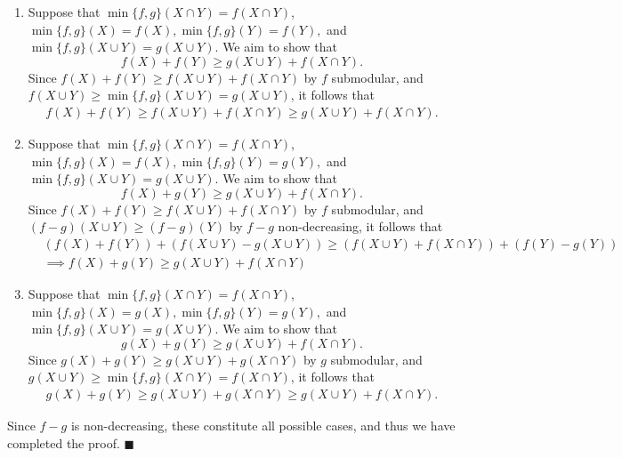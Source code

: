 \documentclass{article}
\begin{document}
\begin{enumerate}[label=(\roman*)]
\begin{enumerate}[label=Case \arabic*:]
      \item Suppose that $\min\{f,g\}(X\cap Y)=f(X\cap Y)$, $\min\{f,g\}(X)=f(X),\min\{f,g\}(Y)=f(Y),$ and $\min\{f,g\}(X\cup Y)=g(X\cup Y).$ We aim to show that $$f(X)+f(Y)\geq g(X\cup Y)+f(X\cap Y).$$Since $f(X)+f(Y)\geq f(X\cup Y)+f(X\cap Y)$ by $f$ submodular, and $f(X\cup Y)\geq \min\{f,g\}(X\cup Y)=g(X\cup Y)$, it follows that
      \begin{align*}
           f(X)+f(Y)\geq f(X\cup Y)+f(X\cap Y)\geq g(X\cup Y)+f(X\cap Y).
      \end{align*}
      \item Suppose that $\min\{f,g\}(X\cap Y)=f(X\cap Y)$, $\min\{f,g\}(X)=f(X),\min\{f,g\}(Y)=g(Y),$ and $\min\{f,g\}(X\cup Y)=g(X\cup Y).$ We aim to show that $$f(X)+g(Y)\geq g(X\cup Y)+f(X\cap Y).$$Since $f(X)+f(Y)\geq f(X\cup Y)+f(X\cap Y)$ by $f$ submodular, and $(f-g)(X\cup Y)\geq (f-g)(Y)$ by $f-g$ non-decreasing, it follows that
      \begin{align*}
           & (f(X)+f(Y))+(f(X\cup Y)-g(X\cup Y)) \geq (f(X\cup Y)+f(X\cap Y))+(f(Y)-g(Y)) \\& \implies f(X)+g(Y) \geq g(X\cup Y)+f(X\cap Y)
      \end{align*}
      \item Suppose that $\min\{f,g\}(X\cap Y)=f(X\cap Y)$, $\min\{f,g\}(X)=g(X),\min\{f,g\}(Y)=g(Y),$ and $\min\{f,g\}(X\cup Y)=g(X\cup Y).$ We aim to show that $$g(X)+g(Y)\geq g(X\cup Y)+f(X\cap Y).$$Since $g(X)+g(Y)\geq g(X\cup Y)+g(X\cap Y)$ by $g$ submodular, and $g(X\cup Y)\geq \min\{f,g\}(X\cap Y)=f(X\cap Y)$, it follows that
      \begin{align*}
           g(X)+g(Y)\geq g(X\cup Y)+g(X\cap Y)\geq g(X\cup Y)+f(X\cap Y).
      \end{align*}
      \end{enumerate}

      Since $f-g$ is non-decreasing, these constitute all possible cases, and thus we have completed the proof. $\blacksquare$
  \end{enumerate}
\end{document}
